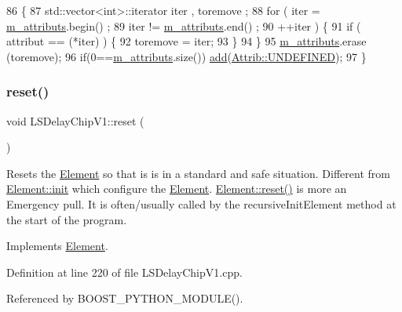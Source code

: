 \begin{DoxyCode}
86                                \{
87     std::vector<int>::iterator iter , toremove ;
88     \textcolor{keywordflow}{for} ( iter  = \hyperlink{classAttrib_ac4bd58a0cc6b38a3b711d609a3d3aacc}{m\_attributs}.begin() ;
89           iter != \hyperlink{classAttrib_ac4bd58a0cc6b38a3b711d609a3d3aacc}{m\_attributs}.end()   ;
90           ++iter ) \{
91       \textcolor{keywordflow}{if} ( attribut == (*iter) ) \{
92         toremove = iter;
93       \}
94     \}
95     \hyperlink{classAttrib_ac4bd58a0cc6b38a3b711d609a3d3aacc}{m\_attributs}.erase (toremove);
96     \textcolor{keywordflow}{if}(0==\hyperlink{classAttrib_ac4bd58a0cc6b38a3b711d609a3d3aacc}{m\_attributs}.size()) \hyperlink{classAttrib_a235f773af19c900264a190b00a3b4ad7}{add}(\hyperlink{classAttrib_a69e171d7cc6417835a5a306d3c764235a3a8da2ab97dda18aebab196fe4100531}{Attrib::UNDEFINED});
97   \}
\end{DoxyCode}
\mbox{\label{classLSDelayChipV1_a6b772084a850e96b2f9bb5600c29259c}} 
\subsubsection{\texorpdfstring{reset()}{reset()}}
{\footnotesize\ttfamily void L\+S\+Delay\+Chip\+V1\+::reset (\begin{DoxyParamCaption}{ }\end{DoxyParamCaption})\hspace{0.3cm}{\ttfamily [virtual]}}

Resets the \hyperlink{classElement}{Element} so that is is in a standard and safe situation. Different from \hyperlink{classElement_af42754b5cabc198869222725218d695c}{Element\+::init} which configure the \hyperlink{classElement}{Element}. \hyperlink{classElement_a69efffa22f06909d768149715565cb56}{Element\+::reset()} is more an Emergency pull. It is often/usually called by the recursive\+Init\+Element method at the start of the program. 

Implements \hyperlink{classElement_a69efffa22f06909d768149715565cb56}{Element}.



Definition at line 220 of file L\+S\+Delay\+Chip\+V1.\+cpp.



Referenced by B\+O\+O\+S\+T\+\_\+\+P\+Y\+T\+H\+O\+N\+\_\+\+M\+O\+D\+U\+L\+E().



